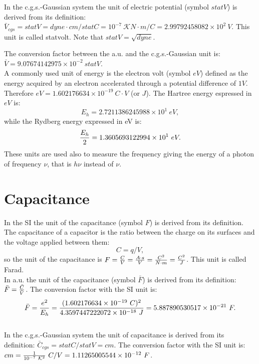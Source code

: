 \documentclass[12pt,a4paper]{article}
\def\e{1.602176634\times 10^{-19}}
\def\baru{4.3597447222072\times 10^{-18}}
\def\barc{1.602176634\times 10^{-19}}
\def\barphi{2.7211386245988\times 10^{1}}
\def\barcap{5.887890530517\times 10^{-21}}
\def\phitophi{2.99792458082\times 10^{2}}
\def\captocap{1.11265005544\times 10^{-12}}
\def\barphicgs{9.07674142975\times 10^{-2}}
\def\ryev{1.3605693122994\times 10^{1}}
\begin{document}
{\color{orange} In the c.g.s.-Gaussian system the unit of electric potential
(symbol $statV$) is derived from its definition: 
$\bar V_{cgs}=statV=dyne\cdot cm / statC = {10^{-7}\ \mathcal{K}} 
N\cdot m/C=\phitophi\ V$. This unit
is called statvolt. Note that 
$statV=\sqrt{dyne}$.
\\
}

{\color{green} 
The conversion factor between the a.u. and the c.g.s.-Gaussian unit
is:
$\bar V = \barphicgs \ statV$.
}
\\

{\color{red} A commonly used unit of energy is the electron volt (symbol $eV$)
defined as the energy acquired by an electron accelerated through a
potential difference of $1 V$. Therefore $eV=\e\ C\cdot V$ (or $J$).
The Hartree energy espressed in $eV$ is: 
\begin{equation}
E_h=\barphi\ eV,
\end{equation}
while the Rydberg energy expressed in eV is:
\begin{equation}
{E_h \over 2}=\ryev\ eV.
\end{equation}
These units are used also to measure the frequency giving the energy
of a photon of frequency $\nu$, that is $h \nu$ instead of $\nu$.
}

\newpage
\section{\color{coral}Capacitance}
In the SI the unit of the capacitance (symbol $F$) is derived from its 
definition. The capacitance of a capacitor is the ratio between the charge
on its surfaces and the voltage applied between them:
\begin{equation}
C=q/V,
\end{equation}
so the unit of the capacitance is $F={C \over V}={A \cdot s \over V}=
{C^2 \over N \cdot m}
={C^2 \over J}$. This unit is called Farad.
\\

{\color{web-blue} In a.u. the unit of the capacitance (symbol $\bar F$) 
is derived from its definition: $\bar F={\bar C \over \bar V}$. The 
conversion factor with the SI unit is:
\begin{equation}
\bar F = {e^2 \over E_h} = {(\barc\ C)^2\over \baru\ J}=\barcap\ F.
\end{equation}
}
\\

{\color{orange} In the c.g.s.-Gaussian system the unit of capacitance
is derived from its definition: $\bar C_{cgs}=statC/statV=cm$. The 
conversion factor with the SI unit is:
$cm={1\over 10^{-7}\ \mathcal{K}^2}\ C/V=\captocap\ F$.
}
\\
\end{document}
